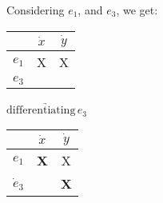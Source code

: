 \begin{enumerate}
	Considering $e_1$, and $e_3$, we get:
	\begin{center}
		\begin{tabular}{c|c c}
			& $\dot x$ & $\dot y$ \\
			\hline
			$e_1$ & X & X \\
			$e_3$ &  &  
		\end{tabular}  $\underrightarrow{\text{differentiating}\,e_3}$ 
		\begin{tabular}{c|c c}
			& $\dot x$ & $\dot y$ \\
			\hline
			$e_1$ & \textbf{X} & X \\
			$\dot e_3$ &  & \textbf{X} 
		\end{tabular} 
	\end{center}	
\end{enumerate}
